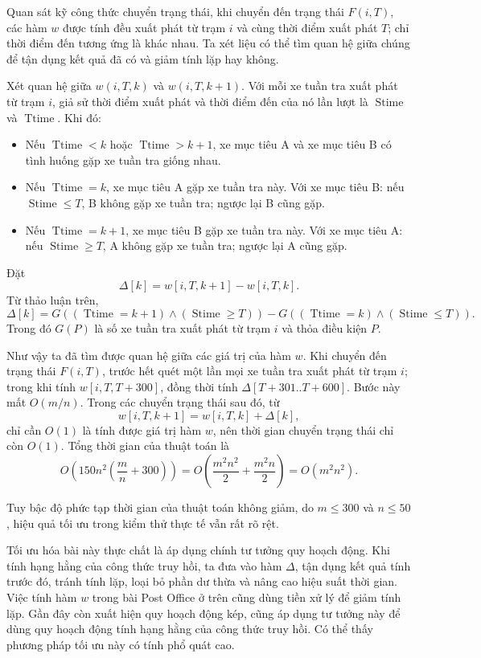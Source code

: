 \documentclass[11pt]{article}
\begin{document}
 Quan sát kỹ công thức chuyển trạng thái, khi chuyển đến
trạng thái \(F(i,T)\), các hàm \(w\) được tính đều xuất phát từ trạm \(i\) và
cùng thời điểm xuất phát \(T\); chỉ thời điểm đến tương ứng là khác nhau. Ta
xét liệu có thể tìm quan hệ giữa chúng để tận dụng kết quả đã có và giảm tính
lặp hay không.

Xét quan hệ giữa \(w(i,T,k)\) và \(w(i,T,k+1)\). Với mỗi xe tuần tra xuất
phát từ trạm \(i\), giả sử thời điểm xuất phát và thời điểm đến của nó lần
lượt là \(\operatorname{Stime}\) và \(\operatorname{Ttime}\). Khi đó:
\begin{itemize}
  \item Nếu \(\operatorname{Ttime}<k\) hoặc \(\operatorname{Ttime}>k+1\), xe
  mục tiêu A và xe mục tiêu B có tình huống gặp xe tuần tra giống nhau.
  \item Nếu \(\operatorname{Ttime}=k\), xe mục tiêu A gặp xe tuần tra này.
  Với xe mục tiêu B: nếu \(\operatorname{Stime}\le T\), B không gặp xe tuần
  tra; ngược lại B cũng gặp.
  \item Nếu \(\operatorname{Ttime}=k+1\), xe mục tiêu B gặp xe tuần tra này.
  Với xe mục tiêu A: nếu \(\operatorname{Stime}\ge T\), A không gặp xe tuần
  tra; ngược lại A cũng gặp.
\end{itemize}

Đặt
\[
  \Delta[k]=w[i,T,k+1]-w[i,T,k].
\]
Từ thảo luận trên,
\[
  \Delta[k]=G((\operatorname{Ttime}=k+1)\wedge(\operatorname{Stime}\ge T))
  -G((\operatorname{Ttime}=k)\wedge(\operatorname{Stime}\le T)).
\]
Trong đó \(G(P)\) là số xe tuần tra xuất phát từ trạm \(i\) và thỏa điều kiện
\(P\).

Như vậy ta đã tìm được quan hệ giữa các giá trị của hàm \(w\). Khi chuyển
đến trạng thái \(F(i,T)\), trước hết quét một lần mọi xe tuần tra xuất phát
từ trạm \(i\); trong khi tính \(w[i,T,T+300]\), đồng thời tính
\(\Delta[T+301..T+600]\). Bước này mất \(O(m/n)\). Trong các chuyển trạng thái
sau đó, từ
\[
  w[i,T,k+1]=w[i,T,k]+\Delta[k],
\]
chỉ cần \(O(1)\) là tính được giá trị hàm \(w\), nên thời gian chuyển trạng
thái chỉ còn \(O(1)\). Tổng thời gian của thuật toán là
\[
  O\left(150n^2\left(\frac{m}{n}+300\right)\right)
  =O\left(\frac{m^2n^2}{2}+\frac{m^2n}{2}\right)
  =O(m^2n^2).
\]

Tuy bậc độ phức tạp thời gian của thuật toán không giảm, do \(m\le300\) và
\(n\le50\), hiệu quả tối ưu trong kiểm thử thực tế vẫn rất rõ rệt.

Tối ưu hóa bài này thực chất là áp dụng chính tư tưởng quy hoạch động. Khi
tính hạng hằng của công thức truy hồi, ta đưa vào hàm \(\Delta\), tận dụng
kết quả tính trước đó, tránh tính lặp, loại bỏ phần dư thừa và nâng cao hiệu
suất thời gian. Việc tính hàm \(w\) trong bài Post Office ở trên cũng dùng
tiền xử lý để giảm tính lặp. Gần đây còn xuất hiện quy hoạch động kép, cũng
áp dụng tư tưởng này để dùng quy hoạch động tính hạng hằng của công thức
truy hồi. Có thể thấy phương pháp tối ưu này có tính phổ quát cao.
\end{document}
